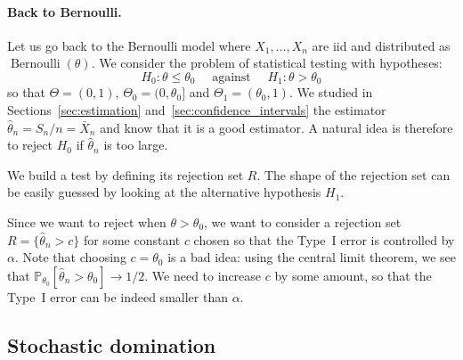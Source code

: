 \documentclass[
	fontsize=11pt, %
	twoside=false, %
	numbers=noenddot, %
]{kaobook}
\DeclareMathOperator{\ber}{Bernoulli}
\renewcommand{\P}{\mathbb P}
\newcommand{\wh}{\widehat}
\newcommand{\goes}{\rightarrow}
\begin{document}
\paragraph{Back to Bernoulli.} %

Let us go back to the Bernoulli model where $X_1, \ldots, X_n$ are iid and distributed as $\ber(\theta)$.
We consider the problem of statistical testing with hypotheses:
\begin{equation}
	\label{eq:chap03-tests-hypothesis}
	H_0 : \theta \leq \theta_0 \quad \text{ against } \quad H_1 : \theta > \theta_0
\end{equation}
so that $\Theta = (0, 1)$, $\Theta_0 = (0, \theta_0]$ and $\Theta_1 = (\theta_0, 1)$.
We studied in Sections~\ref{sec:estimation} and~\ref{sec:confidence_intervals} the estimator $\wh \theta_n = S_n / n = \bar X_n$ and know that it is a good estimator.
A natural idea is therefore to reject $H_0$ if $\wh \theta_n$ is too large.
\begin{recipe}
	We build a test by defining its rejection set $R$. The shape of the rejection set can be easily guessed by looking at the alternative hypothesis $H_1$.
\end{recipe}
Since we want to reject when $\theta > \theta_0$, we want to consider a rejection set $R = \{ \wh \theta_n > c \}$ for some constant $c$ chosen so that the Type~I error is controlled by $\alpha$.
Note that choosing $c = \theta_0$ is a bad idea: using the central limit theorem, we see that $\P_{\theta_0}[\wh \theta_n > \theta_0] \goes 1/2$.
We need to increase $c$ by some amount, so that the Type~I error can be indeed smaller than $\alpha$.%

\subsection{Stochastic domination} %

\end{document}
